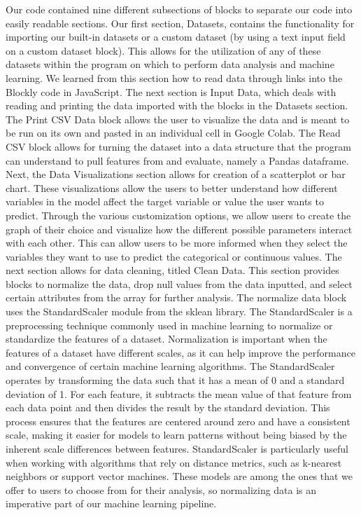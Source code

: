 \documentclass{article}
\theoremstyle{theorem}
\theoremstyle{definition}
\theoremstyle{remark}
\begin{document}
Our code contained nine different subsections of blocks to separate our code into easily readable sections. Our first section, Datasets, contains the functionality for importing our built-in datasets or a custom dataset (by using a text input field on a custom dataset block). This allows for the utilization of any of these datasets within the program on which to perform data analysis and machine learning. We learned from this section how to read data through links into the Blockly code in JavaScript. The next section is Input Data, which deals with reading and printing the data imported with the blocks in the Datasets section. The Print CSV Data block allows the user to visualize the data and is meant to be run on its own and pasted in an individual cell in Google Colab. The Read CSV block allows for turning the dataset into a data structure that the program can understand to pull features from and evaluate, namely a Pandas dataframe. Next, the Data Visualizations section allows for creation of a scatterplot or bar chart. These visualizations allow the users to better understand how different variables in the model affect the target variable or value the user wants to predict. Through the various customization options, we allow users to create the graph of their choice and visualize how the different possible parameters interact with each other. This can allow users to be more informed when they select the variables they want to use to predict the categorical or continuous values. The next section allows for data cleaning, titled Clean Data. This section provides blocks to normalize the data, drop null values from the data inputted, and select certain attributes from the array for further analysis. The normalize data block uses the StandardScaler module from the sklean library. The StandardScaler is a preprocessing technique commonly used in machine learning to normalize or standardize the features of a dataset. Normalization is important when the features of a dataset have different scales, as it can help improve the performance and convergence of certain machine learning algorithms. The StandardScaler operates by transforming the data such that it has a mean of 0 and a standard deviation of 1. For each feature, it subtracts the mean value of that feature from each data point and then divides the result by the standard deviation. This process ensures that the features are centered around zero and have a consistent scale, making it easier for models to learn patterns without being biased by the inherent scale differences between features. StandardScaler is particularly useful when working with algorithms that rely on distance metrics, such as k-nearest neighbors or support vector machines. These models are among the ones that we offer to users to choose from for their analysis, so normalizing data is an imperative part of our machine learning pipeline. 
\end{document}
